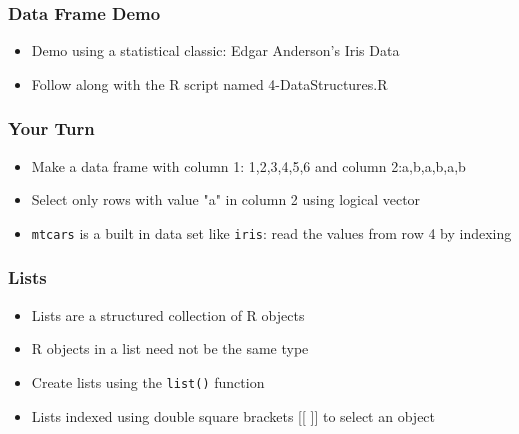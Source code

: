 \documentclass{beamer}\usepackage[]{graphicx}\usepackage[]{color}
\begin{document}

\begin{frame}[fragile]
    \frametitle{Data Frame Demo}
    \begin{itemize}
        \item Demo using a statistical classic: Edgar Anderson's Iris Data
        \item Follow along with the R script named 4-DataStructures.R
    \end{itemize}
\end{frame}


\begin{frame}
    \frametitle{Your Turn}
    \begin{itemize}
        \item Make a data frame with column 1: 1,2,3,4,5,6 and column 2:a,b,a,b,a,b
        \item Select only rows with value "a" in column 2 using logical vector
        \item \texttt{mtcars} is a built in data set like \texttt{iris}: read the values from row 4 by indexing
    \end{itemize}    
\end{frame}


\begin{frame}
    \frametitle{Lists}
    \begin{itemize}
        \item Lists are a structured collection of R objects
        \item R objects in a list need not be the same type
        \item Create lists using the \texttt{list()} function
        \item Lists indexed using double square brackets [[ ]] to select an object
    \end{itemize}    
\end{frame}

\end{document}
